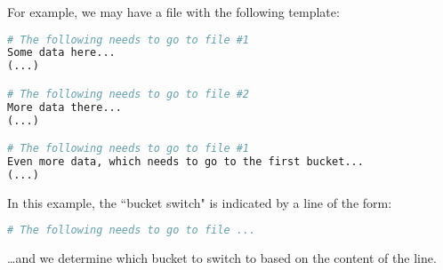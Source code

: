 \medskip

For example, we may have a file with the following template:

\begin{lstlisting}[language=Python]
# The following needs to go to file #1
Some data here...
(...)

# The following needs to go to file #2
More data there...
(...)

# The following needs to go to file #1
Even more data, which needs to go to the first bucket...
(...)	
\end{lstlisting}

\medskip


In this example, the ``bucket switch" is indicated by a line of the form:
\begin{lstlisting}[language=Python]
# The following needs to go to file ...
\end{lstlisting}
\dots and we determine which bucket to switch to based on the content of the line.

